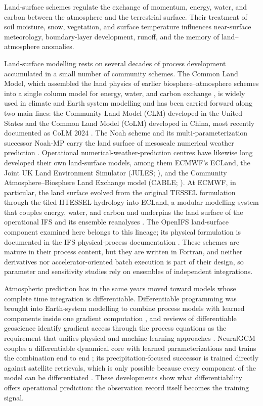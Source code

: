 Land-surface schemes regulate the exchange of momentum, energy, water, and
carbon between the atmosphere and the terrestrial surface. Their treatment of
soil moisture, snow, vegetation, and surface temperature influences
near-surface meteorology, boundary-layer development, runoff, and the memory
of land--atmosphere anomalies.

Land-surface modelling rests on several decades of process development
accumulated in a small number of community schemes. The Common Land Model,
which assembled the land physics of earlier biosphere--atmosphere schemes
into a single column model for energy, water, and carbon exchange
\citep{Dai2003CoLM}, is widely used in climate and Earth system modelling
and has been carried forward along two main lines: the Community Land Model
(CLM) developed in the United States \citep{Oleson2010CLM} and the Common
Land Model (CoLM) developed in China, most recently documented as CoLM 2024
\citep{Dai2004TwoBigLeaf,YuanDai2025CoLM}. The Noah scheme and its
multi-parameterization successor Noah-MP carry the land surface of mesoscale
numerical weather prediction \citep{Niu2011NoahMP}. Operational
numerical-weather-prediction centres have likewise long developed their own
land-surface models, among them ECMWF's ECLand, the Joint UK Land
Environment Simulator (JULES; \citealp{Wiltshire2020JULES}), and the
Community Atmosphere--Biosphere Land Exchange model (CABLE;
\citealp{Haverd2018CABLE}). At ECMWF, in particular, the land surface evolved from
the original TESSEL formulation through the tiled HTESSEL hydrology
\citep{ViterboBeljaars1995,VanDenHurk2000,Balsamo2009} into ECLand, a
modular modelling system that couples energy, water, and carbon and
underpins the land surface of the operational IFS and its ensemble
reanalyses \citep{Boussetta2021ECLand}. The OpenIFS land-surface component
examined here belongs to this lineage; its physical formulation is
documented in the IFS physical-process documentation \citep{ECMWFIFSPartIV}.
These schemes are mature in their process content, but they are written in
Fortran, and neither derivatives nor accelerator-oriented batch execution is
part of their design, so parameter and sensitivity studies rely on ensembles
of independent integrations.

Atmospheric prediction has in the same years moved toward models whose
complete time integration is differentiable. Differentiable programming was
brought into Earth-system modelling to combine process models with learned
components inside one gradient computation \citep{Gelbrecht2023}, and reviews
of differentiable geoscience identify gradient access through the process
equations as the requirement that unifies physical and machine-learning
approaches \citep{Shen2023}. NeuralGCM couples a differentiable dynamical
core with learned parameterizations and trains the combination end to end
\citep{Kochkov2024NeuralGCM}; its precipitation-focused successor is trained
directly against satellite retrievals, which is only possible because every
component of the model can be differentiated \citep{Yuval2026Precip}. These
developments show what differentiability offers operational prediction: the
observation record itself becomes the training signal.


